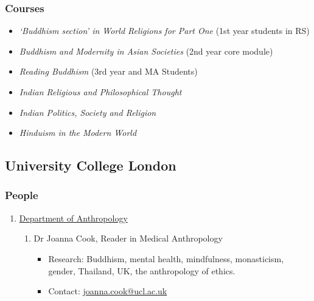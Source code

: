 \documentclass[a4paper,10.5pt]{article}
\begin{document}
\subsubsection{Courses}
\label{sec:org37006f2}
\begin{itemize}
\item \emph{‘Buddhism section’ in World Religions for Part One} (1st year students in RS)\\
\item \emph{Buddhism and Modernity in Asian Societies} (2nd year core module)\\
\item \emph{Reading Buddhism} (3rd year and MA Students)\\
\item \emph{Indian Religious and Philosophical Thought}\\
\item \emph{Indian Politics, Society and Religion}\\
\item \emph{Hinduism in the Modern World}\\
\end{itemize}

\subsection{University College London}
\label{sec:org27adb06}
\subsubsection{People}
\label{sec:org53de531}
\begin{enumerate}
\item \href{https://www.ucl.ac.uk/anthropology/ucl-anthropology}{Department of Anthropology}
\label{sec:org578c210}
\begin{enumerate}
\item Dr Joanna Cook, Reader in Medical Anthropology
\label{sec:org26fbfc5}
\begin{itemize}
\item Research: Buddhism, mental health, mindfulness, monasticism, gender, Thailand, UK, the anthropology of ethics.\\
\item Contact: \href{mailto:joanna.cook@ucl.ac.uk}{joanna.cook@ucl.ac.uk}\\
\end{itemize}
\end{enumerate}
\end{enumerate}
\end{document}
